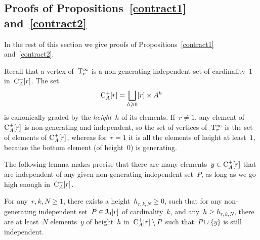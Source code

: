 


\subsection{Proofs of Propositions~\ref{contract1} and~\ref{contract2}}\label{sec:proofs}

In the rest of this section we give proofs of Propositions~\ref{contract1} and~\ref{contract2}.

Recall that a vertex of~$\mathrm{T}_r^\infty$ is a non-generating independent set of cardinality~$1$ in~$\mathrm{C}_A^+[r]$. The set
\[
\mathrm{C}_A^+[r]=\bigsqcup_{h\geqslant 0}[r]\times A^h
\]
is canonically graded by the {\em height}~$h$ of its elements. If~$r\neq 1$, any element of~$\mathrm{C}_A^+[r]$ is non-generating and independent, so the set of vertices of~$\mathrm{T}_r^\infty$ is the set of elements of 
$\mathrm{C}_A^+[r]$, whereas for~$r=1$ it is all the elements of height at least~$1$, because the bottom element (of height~$0$) is generating. 


The following lemma makes precise that there are many elements~$y\in \mathrm{C}_A^+[r]$ that are independent of any given non-generating independent set~$P$, as long as we go high enough in~$\mathrm{C}_A^+[r]$. 

\begin{lemma}\label{lem:height}
For any~$r,k,N\ge 1$, there exists a height~$h_{r,k,N}\ge 0$, such that for any 
non-generating independent set~$P\in \mathcal{I}_0[r]$ of cardinality~$k$, and any~$h\ge h_{r,k,N}$, 
there are at least~$N$ elements~$y$ of height~$h$ in~$\mathrm{C}_A^+[r]\setminus P$ such that~$P\cup \{y\}$ is still independent. 
\end{lemma}



